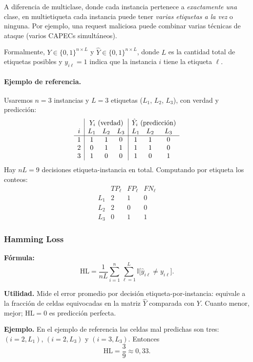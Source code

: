 \documentclass[12pt,oneside]{report}
\newcommand{\ind}{\mathbb{I}} %
\begin{document}
A diferencia de multiclase, donde cada instancia pertenece a
\emph{exactamente una} clase, en multietiqueta cada instancia puede
tener \emph{varias etiquetas a la vez} o ninguna. Por ejemplo, una
request maliciosa puede combinar varias técnicas de ataque (varios
CAPECs simultáneos).

Formalmente, $Y\in\{0,1\}^{n\times L}$ y $\hat{Y}\in\{0,1\}^{n\times L}$,
donde $L$ es la cantidad total de etiquetas posibles y $y_{i\ell}=1$
indica que la instancia $i$ tiene la etiqueta $\ell$.

\paragraph{Ejemplo de referencia.} Usaremos $n=3$ instancias y $L=3$
etiquetas ($L_1$, $L_2$, $L_3$), con verdad y predicción:
\[
\begin{array}{c|ccc|ccc}
 & \multicolumn{3}{c|}{Y_i\ \text{(verdad)}} & \multicolumn{3}{c}{\hat Y_i\ \text{(predicción)}} \\
i & L_1 & L_2 & L_3 & L_1 & L_2 & L_3 \\
\hline
1 & 1 & 1 & 0 & 1 & 1 & 0 \\
2 & 0 & 1 & 1 & 1 & 1 & 0 \\
3 & 1 & 0 & 0 & 1 & 0 & 1
\end{array}
\]
Hay $nL=9$ decisiones etiqueta-instancia en total. Computando por
etiqueta los conteos:
\[
\begin{array}{l|ccc}
 & TP_\ell & FP_\ell & FN_\ell \\
\hline
L_1 & 2 & 1 & 0 \\
L_2 & 2 & 0 & 0 \\
L_3 & 0 & 1 & 1
\end{array}
\]

\subsubsection{Hamming Loss}

\textbf{Fórmula:}
\[
\mathrm{HL}=\frac{1}{nL}\sum_{i=1}^n\sum_{\ell=1}^L \ind\big[\hat{y}_{i\ell}\ne y_{i\ell}\big].
\]

\textbf{Utilidad.} Mide el error promedio por decisión
etiqueta-por-instancia: equivale a la fracción de celdas equivocadas en
la matriz $\hat{Y}$ comparada con $Y$. Cuanto menor, mejor;
$\mathrm{HL}=0$ es predicción perfecta.

\textbf{Ejemplo.} En el ejemplo de referencia las celdas mal predichas
son tres: $(i{=}2,L_1)$, $(i{=}2,L_3)$ y $(i{=}3,L_3)$. Entonces
\[
\mathrm{HL}=\frac{3}{9}\approx 0{,}33.
\]
\end{document}
